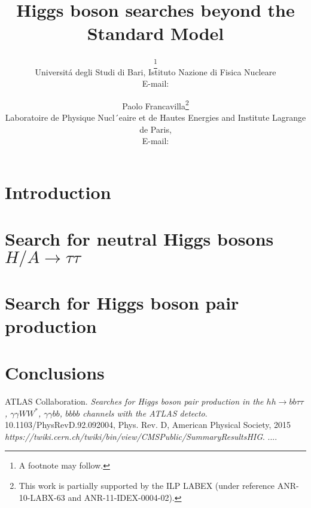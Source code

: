 \documentclass{PoS}
\title{Higgs boson searches beyond the Standard Model}
\author{\speaker{Claudio Caputo}\thanks{A footnote may follow.}\\
        Universit\'a degli Studi di Bari, Istituto Nazione di Fisica Nucleare\\
        E-mail: \email{claudio.caputo@cern.ch}}
\author{Paolo Francavilla\thanks{This work is partially supported by the ILP
LABEX (under reference ANR-10-LABX-63 and ANR-11-IDEX-0004-02).}\\
        Laboratoire de Physique Nucl´eaire et de Hautes Energies and Institute Lagrange de Paris,\\
        E-mail: \email{paolo.francavilla@cern.ch}}
\begin{document}
\section{Introduction}


\newpage
\section{Search for neutral  Higgs bosons $H/A \rightarrow \tau\tau$}


\newpage
\section{Search for Higgs boson pair production}


\newpage
\section{Conclusions}


\begin{thebibliography}{99}
 ATLAS Collaboration. \textsl{Searches for Higgs boson pair production in the $hh\ensuremath{\rightarrow}bb\ensuremath{\tau}\ensuremath{\tau}$, $\ensuremath{\gamma}\ensuremath{\gamma}W{W}^{*}$, $\ensuremath{\gamma}\ensuremath{\gamma}bb$, $bbbb$ channels with the ATLAS detecto}.
		\\10.1103/PhysRevD.92.092004, Phys. Rev. D, American Physical Society, 2015
 \textsl{https://twiki.cern.ch/twiki/bin/view/CMSPublic/SummaryResultsHIG}.
....

\end{thebibliography}
\end{document}
